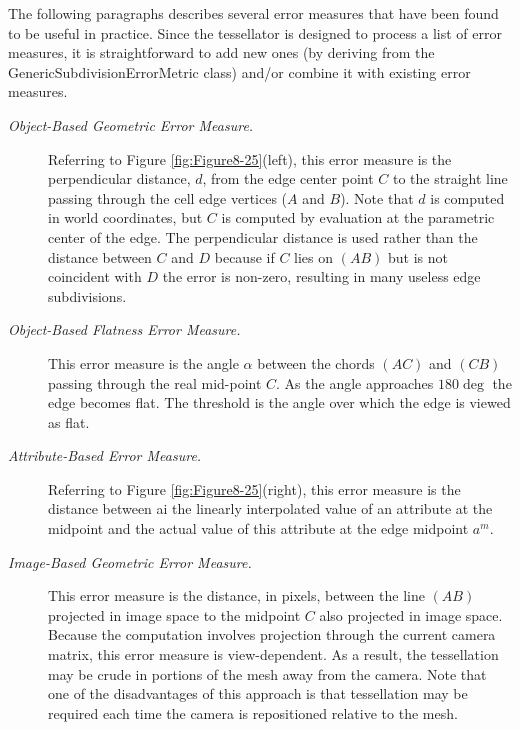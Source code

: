 The following paragraphs describes several error measures that have been found to be useful in practice. Since the tessellator is designed to process a list of error measures, it is straightforward to add new ones (by deriving from the GenericSubdivisionErrorMetric class) and/or combine it with existing error measures.
\begin{description}

    \item [\textit{Object-Based Geometric Error Measure.}] Referring to Figure \ref{fig:Figure8-25}(left), this error measure is the perpendicular distance, $d$, from the edge center point $C$ to the straight line passing through the cell edge vertices ($A$ and $B$). Note that $d$ is computed in world coordinates, but $C$ is computed by evaluation at the parametric center of the edge. The perpendicular distance is used rather than the distance between $C$ and $D$ because if $C$ lies on $(AB)$ but is not coincident with $D$ the error is non-zero, resulting in many useless edge subdivisions.

    \item [\textit{Object-Based Flatness Error Measure.}] This error measure is the angle $\alpha$ between the chords $(AC)$ and $(CB)$ passing through the real mid-point $C$. As the angle approaches $180\deg$ the edge becomes flat. The threshold is the angle over which the edge is viewed as flat.

    \item [\textit{Attribute-Based Error Measure.}] Referring to Figure \ref{fig:Figure8-25}(right), this error measure is the distance between ai the linearly interpolated value of an attribute at the midpoint and the actual value of this attribute at the edge midpoint $a^m$.

    \item [\textit{Image-Based Geometric Error Measure.}] This error measure is the distance, in pixels, between the line $(AB)$ projected in image space to the midpoint $C$ also projected in image space. Because the computation involves projection through the current camera matrix, this error measure is view-dependent. As a result, the tessellation may be crude in portions of the mesh away from the camera. Note that one of the disadvantages of this approach is that tessellation may be required each time the camera is repositioned relative to the mesh.

\end{description}

